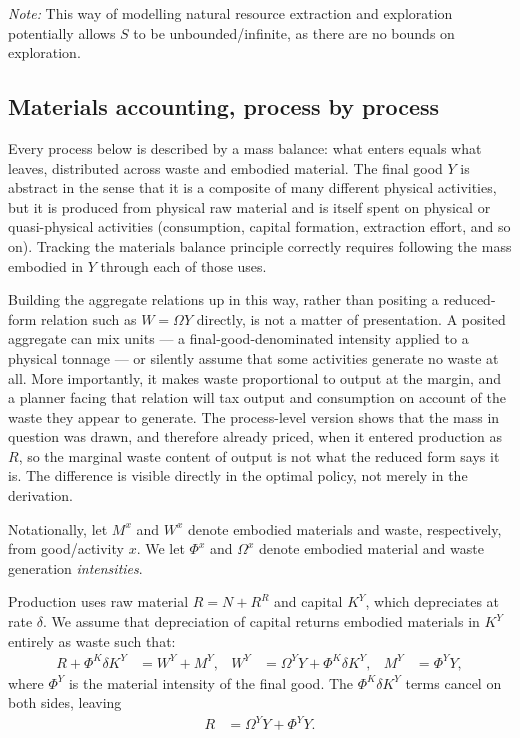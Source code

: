 \textit{Note:} This way of modelling natural resource extraction and exploration potentially allows $S$ to be unbounded/infinite, as there are no bounds on exploration. 


\subsection{Materials accounting, process by process}
\label{sec:sp:setup:materialaccounting}
Every process below is described by a mass balance: what enters equals what leaves, distributed across waste and embodied material. The final good $Y$ is abstract in the sense that it is a composite of many different physical activities, but it is produced from physical raw material and is itself spent on physical or quasi-physical activities (consumption, capital formation, extraction effort, and so on). Tracking the materials balance principle correctly requires following the mass embodied in $Y$ through each of those uses.

Building the aggregate relations up in this way, rather than positing a reduced-form relation such as $W=\Omega Y$ directly, is not a matter of presentation. A posited aggregate can mix units --- a final-good-denominated intensity applied to a physical tonnage --- or silently assume that some activities generate no waste at all. More importantly, it makes waste proportional to output at the margin, and a planner facing that relation will tax output and consumption on account of the waste they appear to generate. The process-level version shows that the mass in question was drawn, and therefore already priced, when it entered production as $R$, so the marginal waste content of output is not what the reduced form says it is. The difference is visible directly in the optimal policy, not merely in the derivation.

Notationally, let $M^x$ and $W^x$ denote embodied materials and waste, respectively, from good/activity $x$. We let $\Phi^x$ and $\Omega^x$ denote embodied material and waste generation \emph{intensities}.

Production uses raw material $R=N+R^R$ and capital $K^Y$, which depreciates at rate $\delta$. We assume that depreciation of capital returns embodied materials in $K^Y$ entirely as waste such that:
\begin{align}
    R+\Phi^K\delta K^Y &= W^Y+M^Y, &
W^Y &= \Omega^YY+\Phi^K\delta K^Y, &
M^Y &= \Phi^YY,
\label{eq:sp:setup:production}
\end{align}
where $\Phi^Y$ is the material intensity of the final good. The $\Phi^K\delta K^Y$ terms cancel on both sides, leaving
\begin{align}
R &= \Omega^YY+\Phi^YY.
\label{eq:sp:setup:production-reduced}
\end{align}


